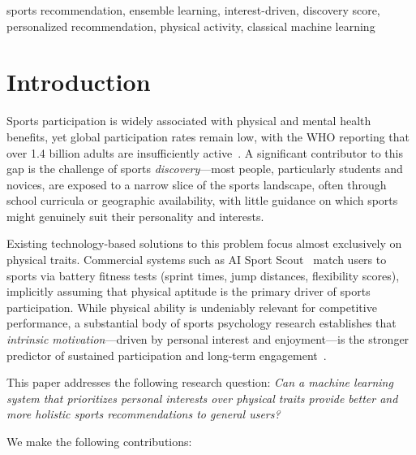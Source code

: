 \documentclass[conference]{IEEEtran}
\begin{document}
\begin{IEEEkeywords}
sports recommendation, ensemble learning, interest-driven, discovery score,
personalized recommendation, physical activity, classical machine learning
\end{IEEEkeywords}

\section{Introduction}
\label{sec:intro}

Sports participation is widely associated with physical and mental health
benefits, yet global participation rates remain low, with the WHO reporting
that over 1.4 billion adults are insufficiently active~\cite{who2022activity}.
A significant contributor to this gap is the challenge of sports
\textit{discovery}---most people, particularly students and novices, are
exposed to a narrow slice of the sports landscape, often through school
curricula or geographic availability, with little guidance on which sports
might genuinely suit their personality and interests.

Existing technology-based solutions to this problem focus almost exclusively
on physical traits. Commercial systems such as AI Sport Scout~\cite{aisportscout2024}
match users to sports via battery fitness tests (sprint times, jump distances,
flexibility scores), implicitly assuming that physical aptitude is the
primary driver of sports participation. While physical ability is undeniably
relevant for competitive performance, a substantial body of sports
psychology research establishes that \textit{intrinsic motivation}---driven
by personal interest and enjoyment---is the stronger predictor of sustained
participation and long-term engagement~\cite{pelletier1995motivation,
vallerand2003passions, fraserThomas2006youth}.

This paper addresses the following research question:
\textit{Can a machine learning system that prioritizes personal interests
over physical traits provide better and more holistic sports recommendations
to general users?}

We make the following contributions:
\end{document}

